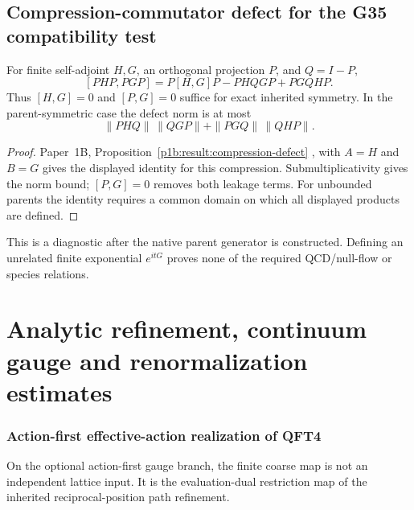 \documentclass[12pt,a4paper]{article}
\begin{document}
\subsection{Compression-commutator defect for the G35 compatibility test}
\label{p11:app:v199-compression-defect}
\begin{proposition}
\label{p11:prop:v199-compression-defect}
For finite self-adjoint \(H,G\), an orthogonal projection \(P\), and
\(Q=I-P\),
\[
 [PHP,PGP]=P[H,G]P-PHQGP+PGQHP.
\]
Thus \([H,G]=0\) and \([P,G]=0\) suffice for exact inherited symmetry.
In the parent-symmetric case the defect norm is at most
\[
 \|PHQ\|\,\|QGP\|+\|PGQ\|\,\|QHP\|.
\]
\end{proposition}
\begin{proof}
Paper~1B, Proposition~\ref{p1b:result:compression-defect}
\cite{Kugelmann2026Paper1B}, with $A=H$ and $B=G$ gives the displayed
identity for this compression. Submultiplicativity gives the norm bound;
$[P,G]=0$ removes both leakage terms. For unbounded parents the identity
requires a common domain on which all displayed products are defined.
\end{proof}
This is a diagnostic after the native parent generator is constructed.
Defining an unrelated finite exponential \(e^{itG}\) proves none of the
required QCD/null-flow or species relations.



\section{Analytic refinement, continuum gauge and renormalization estimates}
\label{p13:sec:v237-d5}
\subsubsection{Action-first effective-action realization of QFT4}
\label{p12:subsec:action-first-effective-rg}

On the optional action-first gauge branch, the finite coarse map is not an
independent lattice input.  It is the evaluation-dual restriction map of the
inherited reciprocal-position path refinement.
\end{document}
